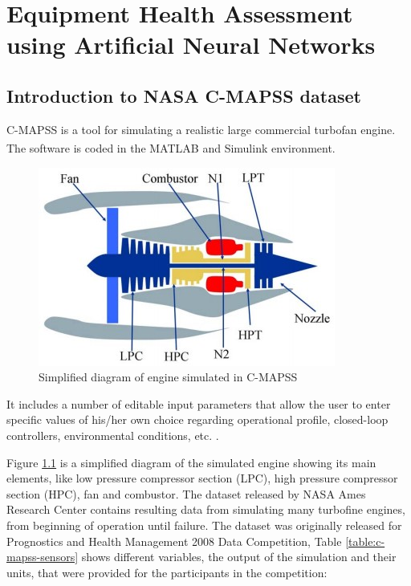 \chapter{Equipment Health Assessment using Artificial Neural Networks}


\section{Introduction to NASA C-MAPSS dataset}

C-MAPSS is a tool for simulating a realistic large commercial turbofan engine. The software is coded in the MATLAB\textsuperscript{\textregistered} and Simulink\textsuperscript{\textregistered} environment.

\begin{figure}
    \centering
    \includegraphics[width=.48\textwidth]{figures/c-mapss-engine-diagram.jpg}
    \caption{Simplified diagram of engine simulated in C-MAPSS \cite{Saxena2008}}
    \label{figure:c-mapss-engine-diagram}    
\end{figure}

It includes a number of editable input parameters that allow the user to enter specific values of his/her own choice regarding operational profile, closed-loop controllers, environmental conditions, etc. \cite{Saxena2008}. 

Figure \ref{figure:c-mapss-engine-diagram} is a simplified diagram of the simulated engine showing its main elements, like low pressure compressor section (LPC), high pressure compressor section (HPC), fan and combustor. The dataset released by NASA Ames Research Center contains resulting data from simulating many turbofine engines, from beginning of operation until failure. The dataset was originally released for Prognostics and Health Management 2008 Data Competition, Table \ref{table:c-mapss-sensors} shows different variables, the output of the simulation and their units, that were provided for the participants in the competition:

